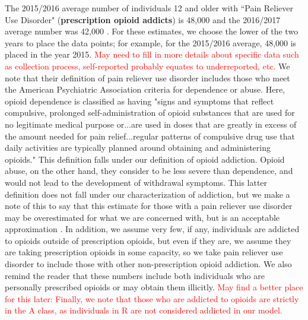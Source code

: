 \documentclass[12pt]{article}
\begin{document}
The 2015/2016 average number of individuals 12 and older with ``Pain Reliever Use Disorder" (\textbf{prescription opioid addicts}) is 48,000 and the 2016/2017 average number was 42,000 \cite{NSDUH2, NSDUH3}. For these estimates, we choose the lower of the two years to place the data points; for example, for the 2015/2016 average, 48,000 is placed in the year 2015. \textcolor{red}{May need to fill in more details about specific data such as collection process, self-reported probably equates to underreported, etc.}
We note that their definition of pain reliever use disorder includes those who meet the American Psychiatric Association criteria for dependence or abuse. Here, opioid dependence is classified as having "signs and symptoms that reflect compulsive, prolonged self-administration of opioid substances that are used for no legitimate medical purpose or...are used in doses that are greatly in excess of the amount needed for pain relief...regular patterns of compulsive drug use that daily activities are typically planned around obtaining and administering opioids." This definition falls under our definition of opioid addiction. Opioid abuse, on the other hand, they consider to be less severe than dependence, and would not lead to the development of withdrawal symptoms. This latter definition does not fall under our characterization of addiction, but we make a note of this to say that this estimate for those with a pain reliever use disorder may be overestimated for what we are concerned with, but is an acceptable approximation \cite{DSM}. In addition, we assume very few, if any, individuals are addicted to opioids outside of prescription opioids, but even if they are, we assume they are taking prescription opioids in some capacity, so we take pain reliever use disorder to include those with other non-prescription opioid addiction. We also remind the reader that these numbers include both individuals who are personally prescribed opioids or may obtain them illicitly.   \textcolor{red}{May find a better place for this later: Finally, we note that those who are addicted to opioids are strictly in the A class, as individuals in R are not considered addicted in our model.}  \\
\end{document}
